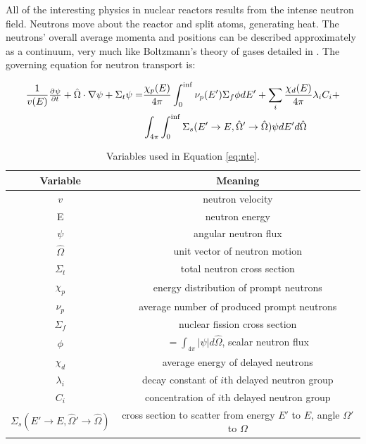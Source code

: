 All of the interesting physics in nuclear reactors results from the intense neutron field. Neutrons move about the reactor and split atoms, generating heat. The neutrons' overall average momenta and positions can be described approximately as a continuum, very much like Boltzmann's theory of gases detailed in \cite{boltzmann_lectures_2011}. The governing equation for neutron transport is:

\begin{equation}
      \begin{aligned}
          \frac{1}{v(E)} \pd{\psi}{t} + \hat{\Omega}\cdot \nabla \psi + {\Sigma_t} \psi =&
          \frac{\chi_p(E)}{4 \pi} \int_{0}^{\inf} \nu_p(E') {\Sigma_f} {\phi} dE' + 
          \sum_i \frac{\chi_d(E)}{4 \pi} \lambda _i C_i + \\
          & \int_{4\pi}  \int_{0}^{\inf} {\Sigma_s(E'\rightarrow E,\hat{\Omega}'\rightarrow \hat{\Omega})} \psi dE' d\hat{\Omega}\\
      \end{aligned}
\label{eq:nte}
\end{equation}

\linespread{1}
\begin{table}[h]
\caption{Variables used in Equation \ref{eq:nte}.}
\centering
\begin{tabular}{c|c}
Variable & Meaning \\
\hline
$v$ & neutron velocity \\
E & neutron energy \\
$\psi$ & angular neutron flux \\
$\hat{\Omega}$ & unit vector of neutron motion \\
$\Sigma_t$ & total neutron cross section \\
$\chi_p$ & energy distribution of prompt neutrons \\
$\nu_p$ & average number of produced prompt neutrons \\
$\Sigma_f$ & nuclear fission cross section \\
$\phi$ & $=\int_{4\pi} |\psi| d\hat{\Omega}$, scalar neutron flux \\
$\chi_d$ & average energy of delayed neutrons \\
$\lambda_i$ & decay constant of $i$th delayed neutron group \\
$C_i$ & concentration of $i$th delayed neutron group \\
$\Sigma_s(E'\rightarrow E,\hat{\Omega}'\rightarrow \hat{\Omega})$ & cross section to scatter from energy $E'$ to $E$, angle $\Omega'$ to $\Omega$ \\
\end{tabular}
\end{table}
\linespread{2}

